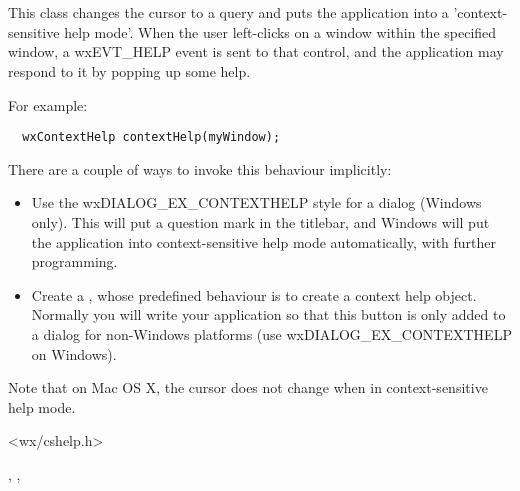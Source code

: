 \section{}\label{wxcontexthelp}

This class changes the cursor to a query and puts the application into a 'context-sensitive help mode'.
When the user left-clicks on a window within the specified window, a wxEVT\_HELP event is
sent to that control, and the application may respond to it by popping up some help.

For example:

\begin{verbatim}
  wxContextHelp contextHelp(myWindow);
\end{verbatim}

There are a couple of ways to invoke this behaviour implicitly:

\begin{itemize}
\item Use the wxDIALOG\_EX\_CONTEXTHELP style for a dialog (Windows only). This will put a question mark
in the titlebar, and Windows will put the application into context-sensitive help mode automatically,
with further programming.
\item Create a , whose predefined behaviour is to create a context help object.
Normally you will write your application so that this button is only added to a dialog for non-Windows platforms
(use wxDIALOG\_EX\_CONTEXTHELP on Windows).
\end{itemize}

Note that on Mac OS X, the cursor does not change when in context-sensitive
help mode.




<wx/cshelp.h>


, 
, 


\label{wxcontexthelpctor}



